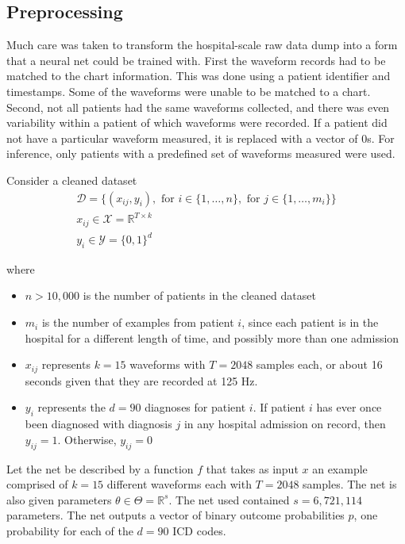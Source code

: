\subsection{Preprocessing}

Much care was taken to transform the hospital-scale raw data dump into a form that a neural net could be trained with.  First the waveform records had to be matched to the chart information.  This was done using a patient identifier and timestamps.  Some of the waveforms were unable to be matched to a chart.  Second, not all patients had the same waveforms collected, and there was even variability within a patient of which waveforms were recorded. If a patient did not have a particular waveform measured, it is replaced with a vector of 0s.  For inference, only patients with a predefined set of waveforms measured were used.

\figIcuIcdMi
\figIcuExampleWaveforms

Consider a cleaned dataset
\begin{gather}
    \mathcal{D} = \{
        (x_{ij}, y_i),
        \text{ for } i \in \{ 1, \dots, n \},
        \text{ for } j \in \{ 1, \dots, m_i \}
    \} \\
    x_{ij} \in \mathcal{X} = \mathbb{R}^{T \times k} \\
    y_i \in \mathcal{Y} = \{0, 1\}^d
\end{gather}

where

\begin{itemize}
    \item $n > 10,000$ is the number of patients in the cleaned dataset
    \item $m_i$ is the number of examples from patient $i$, since each patient is in the hospital for a different length of time, and possibly more than one admission
    \item $x_{ij}$ represents $k = 15$ waveforms with $T = 2048$ samples each, or about 16 seconds given that they are recorded at 125 Hz.
    \item $y_i$ represents the $d = 90$ diagnoses for patient $i$.  If patient $i$ has ever once been diagnosed with diagnosis $j$ in any hospital admission on record, then $y_{ij} = 1$.  Otherwise, $y_{ij} = 0$
\end{itemize}

Let the net be described by a function $f$ that takes as input $x$ an example comprised of $k=15$ different waveforms each with $T=2048$ samples.  The net is also given parameters $\theta \in \Theta = \mathbb{R}^s$.  The net used contained $s = 6,721,114$ parameters.  The net outputs a vector of binary outcome probabilities $p$, one probability for each of the $d=90$ ICD codes.

